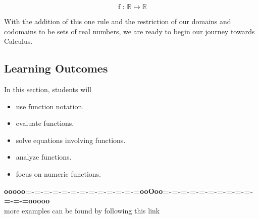 \documentclass{ximera}
\begin{document}
\[
\text{ f : } \mathbb{R} \mapsto \mathbb{R}
\]





With the addition of this one rule and the restriction of our domains and codomains to be sets of real numbers, we are ready to begin our journey towards Calculus.








\subsection*{Learning Outcomes}


\begin{sectionOutcomes}
In this section, students will 

\begin{itemize}
\item use function notation.
\item evaluate functions.
\item solve equations involving functions.
\item analyze functions.
\item focus on numeric functions.
\end{itemize}
\end{sectionOutcomes}







\begin{center}
\textbf{\textcolor{green!50!black}{ooooo=-=-=-=-=-=-=-=-=-=-=-=-=ooOoo=-=-=-=-=-=-=-=-=-=-=-=-=ooooo}} \\

more examples can be found by following this link\\ 

\end{center}
\end{document}
